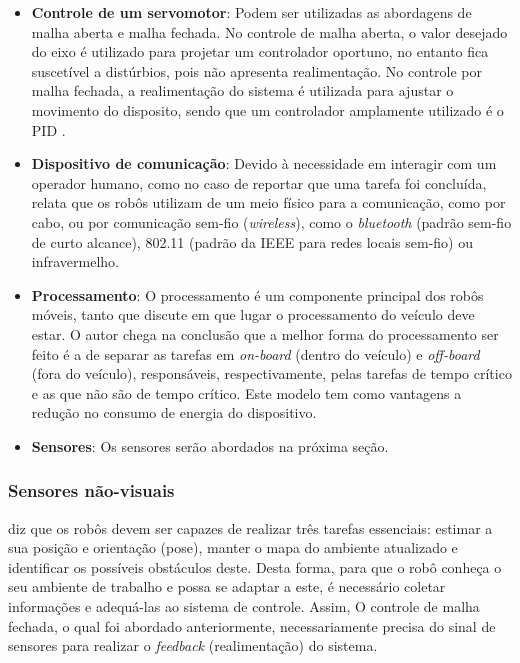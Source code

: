 \begin{itemize}
\item[] \textbf{Controle de um servomotor}: Podem ser utilizadas as abordagens de malha aberta e malha fechada. No controle 
de malha aberta, o valor desejado do eixo é utilizado para projetar um controlador oportuno, no entanto fica 
suscetível a distúrbios, pois não apresenta realimentação. No controle por malha fechada, a realimentação do sistema é utilizada para 
ajustar o movimento do disposito, sendo que um controlador amplamente utilizado é o PID \cite{dudek_mobile}.

\item[] \textbf{Dispositivo de comunicação}: Devido à necessidade em interagir com um operador humano, como no caso de reportar que 
uma tarefa foi concluída,  relata que os robôs utilizam de um meio físico para a comunicação, como por cabo, ou 
por comunicação sem-fio (\textit{wireless}), como o \textit{bluetooth} (padrão sem-fio de curto alcance), 802.11 (padrão da IEEE 
 para redes locais sem-fio) ou infravermelho.

\item[] \textbf{Processamento}: O processamento é um componente principal dos robôs móveis, tanto que  
discute em que lugar o processamento do veículo deve estar. O autor chega na conclusão que a melhor forma do processamento ser feito é 
a de separar as tarefas em \textit{on-board} (dentro do veículo) e \textit{off-board} (fora do veículo), responsáveis, 
respectivamente, pelas tarefas de tempo crítico e as que não são de tempo crítico. Este modelo tem como vantagens a redução no consumo 
de energia do dispositivo.

\item[] \textbf{Sensores}: Os sensores serão abordados na próxima seção.

\end{itemize}

\subsubsection{Sensores não-visuais}

{} diz que os robôs devem ser capazes de realizar três tarefas essenciais: estimar a sua posição e orientação 
(pose), manter o mapa do ambiente atualizado e identificar os possíveis obstáculos deste. %
Desta forma, para que o robô conheça o seu ambiente de trabalho e possa se adaptar a este, é necessário coletar informações e 
adequá-las ao sistema de controle. Assim, O controle de malha fechada, o qual foi abordado anteriormente, 
necessariamente precisa do sinal de sensores para realizar o \textit{feedback} (realimentação) do sistema.\par

